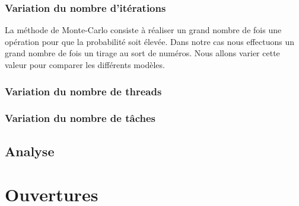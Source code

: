 \documentclass[a4paper,12pt]{article}
\begin{document}
\subsubsection{Variation du nombre d'itérations}
La méthode de Monte-Carlo consiste à réaliser un grand nombre de fois une opération pour que la probabilité soit élevée. Dans notre cas nous effectuons un grand nombre de fois un tirage au sort de numéros. Nous allons varier cette valeur pour comparer les différents modèles.\\

\subsubsection{Variation du nombre de threads}

\subsubsection{Variation du nombre de tâches}


\subsection{Analyse}


\section{Ouvertures}

\newpage

\nocite{*} %


\end{document}
